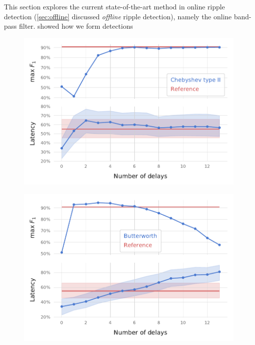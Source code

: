 \label{sec:BPF}

This section explores the current state-of-the-art method in online ripple detection (\cref{sec:offline} discussed \emph{offline} ripple detection), namely the online band-pass filter.  showed how we form detections 

\clearpage
\begin{figure}
\includegraphics{figures/searcharray-cheby2}
\end{figure}

\begin{figure}
\includegraphics{figures/searcharray-butter}
\end{figure}
